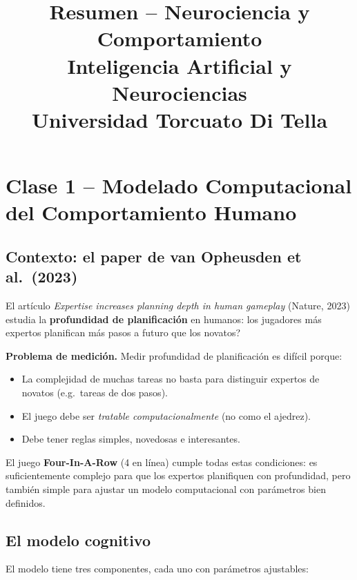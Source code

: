\documentclass[11pt, a4paper]{article}
\title{\textbf{Resumen -- Neurociencia y Comportamiento} \\
\large Inteligencia Artificial y Neurociencias \\ Universidad Torcuato Di Tella}
\author{}
\date{}
\begin{document}
\maketitle

\section{Clase 1 -- Modelado Computacional del Comportamiento Humano}

\subsection{Contexto: el paper de van Opheusden et al.\ (2023)}

El art\'iculo \textit{Expertise increases planning depth in human gameplay} (Nature, 2023) estudia la \textbf{profundidad de planificaci\'on} en humanos: \textquestiondown los jugadores m\'as expertos planifican m\'as pasos a futuro que los novatos?

\textbf{Problema de medici\'on.} Medir profundidad de planificaci\'on es dif\'icil porque:
\begin{itemize}[nosep]
    \item La complejidad de muchas tareas no basta para distinguir expertos de novatos (e.g.\ tareas de dos pasos).
    \item El juego debe ser \emph{tratable computacionalmente} (no como el ajedrez).
    \item Debe tener reglas simples, novedosas e interesantes.
\end{itemize}
El juego \textbf{Four-In-A-Row} (4 en l\'inea) cumple todas estas condiciones: es suficientemente complejo para que los expertos planifiquen con profundidad, pero tambi\'en simple para ajustar un modelo computacional con par\'ametros bien definidos.

\subsection{El modelo cognitivo}

El modelo tiene tres componentes, cada uno con par\'ametros ajustables:
\end{document}
